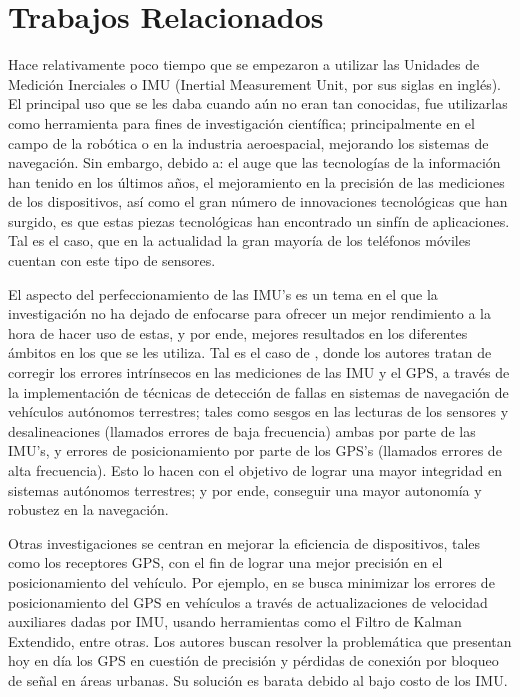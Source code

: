 \chapter{Trabajos Relacionados} 
Hace relativamente poco tiempo que se empezaron a utilizar las Unidades de Medición Inerciales o IMU (Inertial Measurement Unit, por sus siglas en inglés).
El principal uso que se les daba cuando aún no eran tan conocidas, fue utilizarlas como herramienta para fines de investigación científica; principalmente en el campo de la robótica o en la industria aeroespacial, mejorando los sistemas de navegación. 
Sin embargo, debido a: el auge que las tecnologías de la información han tenido en los últimos años, el mejoramiento en la precisión de las mediciones de los dispositivos, así como el gran número de innovaciones tecnológicas que han surgido, es que estas piezas tecnológicas han encontrado un sinfín de aplicaciones. 
Tal es el caso, que en la actualidad la gran mayoría de los teléfonos móviles cuentan con este tipo de sensores.

El aspecto del perfeccionamiento de las IMU’s es un tema en el que la investigación no ha dejado de enfocarse para ofrecer un mejor rendimiento a la hora de hacer uso de estas, y por ende, mejores resultados en los diferentes ámbitos en los que se les utiliza. 
Tal es el caso de \cite{768189}, donde los autores tratan de corregir los errores intrínsecos en las mediciones de las IMU y el GPS, a través de la implementación de técnicas de detección de fallas en sistemas de navegación de vehículos autónomos terrestres; tales como sesgos en las lecturas de los sensores y desalineaciones (llamados errores de baja frecuencia) ambas por parte de las IMU’s, y errores de posicionamiento por parte de los GPS’s (llamados errores de alta frecuencia). 
Esto lo hacen con el objetivo de lograr una mayor integridad en sistemas autónomos terrestres; y por ende, conseguir una mayor autonomía y robustez en la navegación.

Otras investigaciones se centran en mejorar la eficiencia de dispositivos, tales como los receptores GPS, con el fin de lograr una mejor precisión en el posicionamiento del vehículo.
Por ejemplo, en \cite{NAVI:NAVI403} se busca minimizar los errores de posicionamiento del GPS en vehículos a través de actualizaciones de velocidad auxiliares dadas por IMU, usando herramientas como el Filtro de Kalman Extendido, entre otras. 
Los autores buscan resolver la problemática que presentan hoy en día los GPS en cuestión de precisión y pérdidas de conexión por bloqueo de señal en áreas urbanas.
Su solución es barata debido al bajo costo de los IMU.

